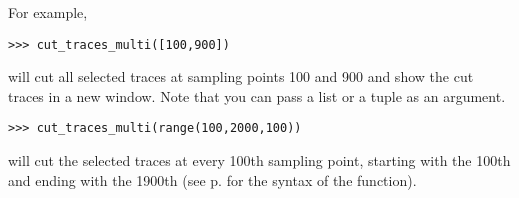 For example,
\begin{lstlisting}
>>> cut_traces_multi([100,900])
\end{lstlisting}
will cut all selected traces at sampling points 100 and 900 and show the cut traces in a new window. Note that you can pass a list or a tuple as an argument.
\begin{lstlisting}
>>> cut_traces_multi(range(100,2000,100))
\end{lstlisting}
will cut the selected traces at every 100th sampling point, starting with the 100th and ending with the 1900th (see p. \pageref{range} for the syntax of the  function).
